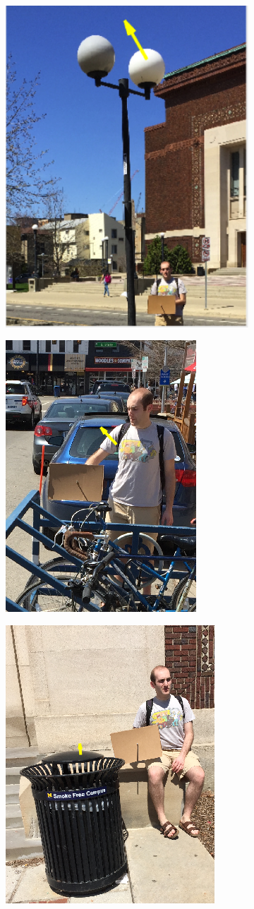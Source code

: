 \documentclass[10pt,twocolumn,letterpaper]{article}
\begin{document}
\begin{figure}[hbtp]
\begin{subfigure}{.5\linewidth}
  \caption{}
  \label{fig:sfig2}
\end{subfigure}
\begin{subfigure}{.5\linewidth}
  \centering
	\includegraphics[width=0.5\linewidth]{lamppost.png}
  \caption{}
  \label{fig:sfig3}
\end{subfigure}
\begin{subfigure}{.5\linewidth}
  \centering
	\includegraphics[width=0.5\linewidth]{bike_rack_1.png}
  \caption{}
  \label{fig:sfig4}
\end{subfigure}
\begin{subfigure}{.5\linewidth}
  \centering
	\includegraphics[width=0.5\linewidth]{garbage_can.png}

\end{subfigure}
\end{figure}
\end{document}

